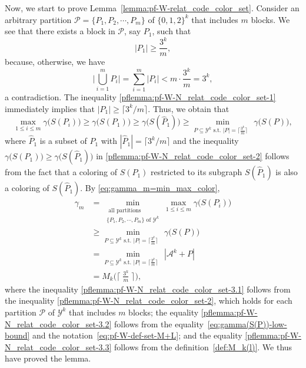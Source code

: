 \documentclass[11pt,draftclsnofoot,onecolumn]{IEEEtran}
\begin{document}
\begin{journalonly}
{Now, we start to prove Lemma~\ref{lemma:pf-W-relat_code_color_set}.
Consider an arbitrary partition $\mathcal{P}=\{P_1,P_2,\cdots,P_m\}$ of  $\{0,1,2\}^{k}$ that  includes  $m$  blocks. We see that there exists a block in $\mathcal{P}$, say $P_1$, such that
\begin{equation}
|P_1|\geq \frac{3^k}{m},\label{pflemma:pf-W-N_relat_code_color_set-1}
\end{equation}
 because, otherwise, we have
 \begin{equation}
 \bigg|\bigcup_{i=1}^{m}P_i\bigg|=\sum_{i=1}^{m}|P_i|<m\cdot\frac{3^k}{m}=3^k,
 \end{equation}
a contradiction.
The inequality \eqref{pflemma:pf-W-N_relat_code_color_set-1} immediately implies that
$|P_1|\geq \big\lceil3^{k}/m\big\rceil$. Thus, we obtain that
\begin{equation}
\max_{1\leq i\leq m}\gamma\big(S(P_i)\big)\geq \gamma\big(S(P_1)\big)\geq \gamma\big(S(\widehat{P}_1)\big) \geq\min_{\text{$P\subseteq\mathcal{Y}^{k}$ s.t. $|P|=\big\lceil\frac{3^{k}}{m}\big\rceil$ }}\gamma\big(S(P)\big),\label{pflemma:pf-W-N_relat_code_color_set-2}
\end{equation}
where $\widehat{P}_1$ is a subset of $P_1$ with $|\widehat{P}_1|= \big\lceil3^{k}/m\big\rceil$ and
the inequality $\gamma\big(S(P_1)\big)\geq \gamma\big(S(\widehat{P}_1)\big)$ in \eqref{pflemma:pf-W-N_relat_code_color_set-2} follows from the fact that a coloring of $S(P_1)$ restricted to its subgraph $S(\widehat{P}_1)$ is also a coloring of $S(\widehat{P}_1)$.
By \eqref{eq:gamma_m=min_max_color},
\begin{align}
\gamma_{m}&=\min_{\substack{\text{ all  partitions }\\\text{$\{P_1,P_2,\cdots,P_m\}$ of $\mathcal{Y}^{k}$}}}\max_{1\leq i\leq m}\gamma\big(S(P_i)\big)\\
&\geq\min_{\text{$P\subseteq\mathcal{Y}^{k}$ s.t. $|P|=\big\lceil\frac{3^{k}}{m}\big\rceil$ }}\gamma\big(S(P)\big)\label{pflemma:pf-W-N_relat_code_color_set-3.1}\\
&=\min_{\text{$P\subseteq\mathcal{Y}^{k}$ s.t. $|P|=\big\lceil\frac{3^{k}}{m}\big\rceil$ }}|\mathcal{A}^k+P|\label{pflemma:pf-W-N_relat_code_color_set-3.2}\\
&=M_{k}\Big(\Big\lceil\;\frac{3^{k}}{m}\;\Big\rceil\Big),\label{pflemma:pf-W-N_relat_code_color_set-3.3}
\end{align}
where the inequality \eqref{pflemma:pf-W-N_relat_code_color_set-3.1} follows from the inequality \eqref{pflemma:pf-W-N_relat_code_color_set-2}, which holds for each partition $\mathcal{P}$ of $\mathcal{Y}^k$ that includes $m$ blocks;   the  equality \eqref{pflemma:pf-W-N_relat_code_color_set-3.2} follows from the equality~\eqref{eq:gamma(S(P))-low-bound} and the notation~\eqref{eq:pf-W-def-set-M+L}; and  the  equality \eqref{pflemma:pf-W-N_relat_code_color_set-3.3} follows from the definition~\eqref{def:M_k(l)}.
We thus have proved the lemma.
}
\end{journalonly}
\end{document}
